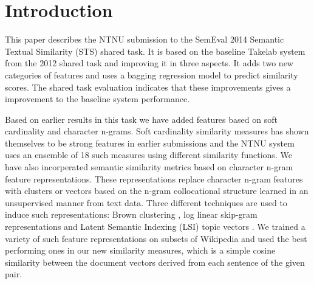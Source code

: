\section{Introduction}
\label{intro}


This paper describes the NTNU submission to the SemEval 2014 Semantic Textual Similarity (STS) shared task. It is based on  the baseline Takelab system from the 2012 shared task and improving it in three aspects. It adds two new categories of features and uses a bagging regression model to predict similarity scores. The shared task evaluation indicates that these improvements gives a improvement to the baseline system performance.

Based on earlier results in this task we have added features based on soft cardinality and character n-grams. Soft cardinality similarity measures has shown themselves to be strong features in earlier submissions \cite{jimenez_softcardinality-core:_2013} and the NTNU system uses an ensemble of 18 such measures using different similarity functions.
We have also incorperated semantic similarity metrics based on character n-gram feature representations. These representations replace character n-gram features with clusters or vectors based on the n-gram collocational structure learned in an unsupervised manner from text data. Three different techniques are used to induce such representations: Brown clustering \cite{brown1992class}, log linear skip-gram representations \cite{mikolov2013efficient} and Latent Semantic Indexing (LSI) topic vectors \cite{deerwester1990indexing}. We trained a variety of such feature representations on subsets of Wikipedia and used the best performing ones in our new similarity measures, which is a simple cosine similarity between the document vectors derived from each sentence of the given pair.

